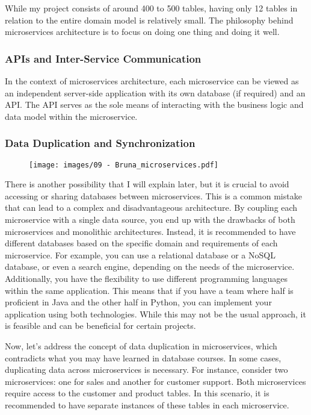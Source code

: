 While my project consists of around 400 to 500 tables, having only 12
tables in relation to the entire domain model is relatively small. The
philosophy behind microservices architecture is to focus on doing one
thing and doing it well.

\subsubsection{APIs and Inter-Service Communication}

In the context of microservices architecture, each microservice can be
viewed as an independent server-side application with its own database
(if required) and an API. The API serves as the sole means of
interacting with the business logic and data model within the
microservice.

\subsubsection{Data Duplication and Synchronization}

\begin{figure}[!h]
  \centering
  \texttt{[image: images/09 - Bruna\_microservices.pdf]}
\end{figure}

There is another possibility that I will explain later, but it is
crucial to avoid accessing or sharing databases between microservices.
This is a common mistake that can lead to a complex and disadvantageous
architecture. By coupling each microservice with a single data source,
you end up with the drawbacks of both microservices and monolithic
architectures. Instead, it is recommended to have different databases
based on the specific domain and requirements of each microservice. For
example, you can use a relational database or a NoSQL database, or even
a search engine, depending on the needs of the microservice.
Additionally, you have the flexibility to use different programming
languages within the same application. This means that if you have a
team where half is proficient in Java and the other half in Python, you
can implement your application using both technologies. While this may
not be the usual approach, it is feasible and can be beneficial for
certain projects.

Now, let's address the concept of data duplication in microservices,
which contradicts what you may have learned in database courses. In some
cases, duplicating data across microservices is necessary. For instance,
consider two microservices: one for sales and another for customer
support. Both microservices require access to the customer and product
tables. In this scenario, it is recommended to have separate instances
of these tables in each microservice.

